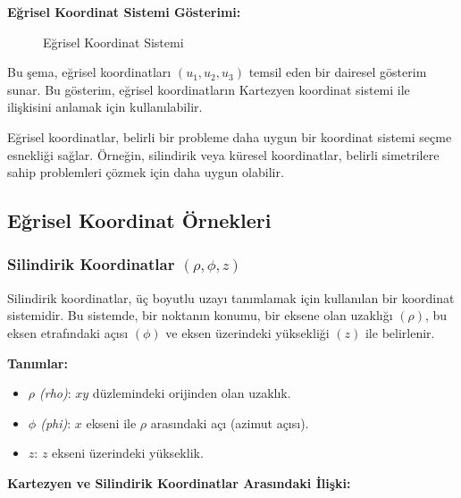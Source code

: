 \documentclass[11pt,letterpaper,twocolumn]{fenbil}
\begin{document}
\textbf{Eğrisel Koordinat Sistemi Gösterimi:}

\begin{figure}[htbp]
    \centering
    \caption{Eğrisel Koordinat Sistemi}
    \label{fig:egrisel_koordinat}
\end{figure}

Bu şema, eğrisel koordinatları $(u_1, u_2, u_3)$ temsil eden bir dairesel gösterim sunar. Bu gösterim, eğrisel koordinatların Kartezyen koordinat sistemi ile ilişkisini anlamak için kullanılabilir.

Eğrisel koordinatlar, belirli bir probleme daha uygun bir koordinat sistemi seçme esnekliği sağlar. Örneğin, silindirik veya küresel koordinatlar, belirli simetrilere sahip problemleri çözmek için daha uygun olabilir.

\subsection{Eğrisel Koordinat Örnekleri}

\subsubsection{Silindirik Koordinatlar $(\rho, \phi, z)$}

Silindirik koordinatlar, üç boyutlu uzayı tanımlamak için kullanılan bir koordinat sistemidir. Bu sistemde, bir noktanın konumu, bir eksene olan uzaklığı $(\rho)$, bu eksen etrafındaki açısı $(\phi)$ ve eksen üzerindeki yüksekliği $(z)$ ile belirlenir.

\textbf{Tanımlar:}

\begin{itemize}
    \item \textit{$\rho$ (rho)}: $xy$ düzlemindeki orijinden olan uzaklık.
    \item \textit{$\phi$ (phi)}: $x$ ekseni ile $\rho$ arasındaki açı (azimut açısı).
    \item \textit{$z$}: $z$ ekseni üzerindeki yükseklik.
\end{itemize}

\textbf{Kartezyen ve Silindirik Koordinatlar Arasındaki İlişki:}
\end{document}
